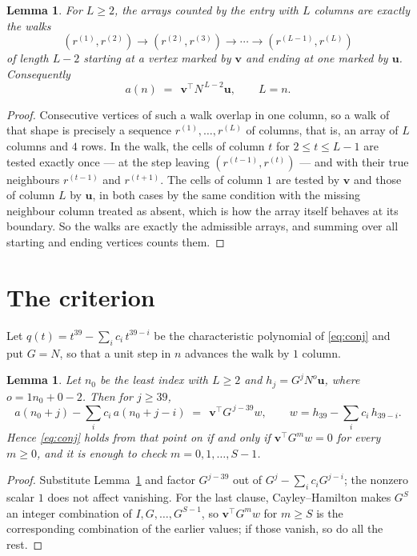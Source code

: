 \documentclass[11pt,a4paper]{article}
\theoremstyle{plain}
\newtheorem{lemma}[theorem]{Lemma}
\theoremstyle{definition}
\begin{document}
\begin{lemma}\label{lem:walk}
For $L\ge2$, the arrays counted by the entry with $L$ columns are exactly the walks
\[
(r^{(1)},r^{(2)})\to(r^{(2)},r^{(3)})\to\cdots\to(r^{(L-1)},r^{(L)})
\]
of length $L-2$ starting at a vertex marked by $\mathbf{v}$ and ending at one marked by
$\mathbf{u}$. Consequently
\[
a(n)\;=\;\,\mathbf{v}^{\!\top}N^{\,L-2}\mathbf{u},\qquad L=n .
\]
\end{lemma}

\begin{proof}
Consecutive vertices of such a walk overlap in one column, so a walk of that shape is
precisely a sequence $r^{(1)},\dots,r^{(L)}$ of columns, that is, an array of $L$ columns
and $4$ rows. In the walk, the cells of column $t$ for $2\le t\le L-1$ are tested
exactly once --- at the step leaving $(r^{(t-1)},r^{(t)})$ --- and with their true
neighbours $r^{(t-1)}$ and $r^{(t+1)}$. The cells of column $1$ are tested by
$\mathbf{v}$ and those of column $L$ by $\mathbf{u}$, in both cases by the same condition
with the missing neighbour column treated as absent, which is how the array itself behaves at
its boundary. So the walks are exactly the admissible arrays, and summing over all starting
and ending vertices counts them.
\end{proof}

\section{The criterion}

Let $q(t)=t^{39}-\sum_i c_i\,t^{39-i}$ be the characteristic polynomial of
\eqref{eq:conj} and put $G=N$, so that a unit step in $n$ advances the walk by
$1$ column.

\begin{lemma}\label{lem:crit}
Let $n_0$ be the least index with $L\ge2$ and $h_j=G^{j}N^{o}\mathbf{u}$, where
$o=1n_0+0-2$. Then for $j\ge39$,
\[
a(n_0+j)-\sum_i c_i\,a(n_0+j-i)\;=\;\,\mathbf{v}^{\!\top}G^{\,j-39}w,
\qquad w=h_{39}-\sum_i c_i\,h_{39-i} .
\]
Hence \eqref{eq:conj} holds from that point on if and only if
$\mathbf{v}^{\!\top}G^{m}w=0$ for every $m\ge0$, and it is enough to check
$m=0,1,\dots,S-1$.
\end{lemma}

\begin{proof}
Substitute Lemma~\ref{lem:walk} and factor $G^{j-39}$ out of
$G^{j}-\sum_ic_iG^{j-i}$; the nonzero scalar $1$ does not affect
vanishing. For the last clause, Cayley--Hamilton makes $G^{S}$ an integer combination of
$I,G,\dots,G^{S-1}$, so $\mathbf{v}^{\!\top}G^{m}w$ for $m\ge S$ is the corresponding
combination of the earlier values; if those vanish, so do all the rest.
\end{proof}
\end{document}

